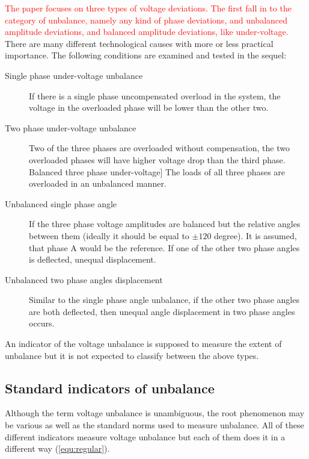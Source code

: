         \textcolor{red}{The paper focuses on three types of voltage deviations. The first fall in to the category of unbalance, namely any kind of phase deviations, and unbalanced amplitude deviations, and balanced amplitude deviations, like under-voltage.} There are many different technological causes with more or less practical importance. The following conditions are examined and tested in the sequel:
        \begin{description}
        \item[Single phase under-voltage unbalance]  If there is a single phase uncompensated overload in the system, the voltage in the overloaded phase will be lower than the other two.
        \item[Two phase under-voltage unbalance]  Two of the three phases are overloaded without compensation, the two overloaded phases will have higher voltage drop than the third phase.
        Balanced three phase under-voltage]  The loads of all three phases are overloaded in an unbalanced manner.
        \item[Unbalanced single phase angle]  If the three phase voltage amplitudes are balanced but the relative angles between them (ideally it should be equal to $\pm120$ degree). It is assumed, that phase A would be the reference. If one of the other two phase angles is deflected, unequal displacement.
        \item[Unbalanced two phase angles displacement] Similar to the single phase angle unbalance, if the other two phase angles are both deflected, then unequal angle displacement in two phase angles occurs.
        \end{description}
        An indicator of the voltage unbalance is supposed to measure the extent of unbalance but it is not expected to classify between the above types.

        \subsection{Standard indicators of unbalance}

            Although the term voltage unbalance is unambiguous, the root phenomenon may be various as well as the standard norms used to measure unbalance. All of these different indicators measure voltage unbalance but each of them does it in a different way (\ref{equ:regular}).

